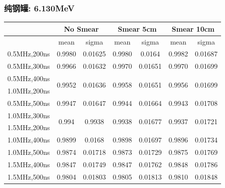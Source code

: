 \begin{frame}
    \frametitle{纯钢罐: 6.130MeV}

\begin{tabular}{|c|cc|cc|cc|}
\hline
 & \multicolumn{2}{|c|}{No Smear} 
 & \multicolumn{2}{|c|}{Smear 5cm}
 & \multicolumn{2}{|c|}{Smear 10cm}
\\
\hline
 & mean & sigma
 & mean & sigma
 & mean & sigma
\\
\hline
0.5MHz,200ns
 & 0.9980 &  0.01625
 & 0.9980 &  0.0164
 & 0.9982 &  0.01687
\\
\hline
0.5MHz,300ns
 & 0.9966 &  0.01632
 & 0.9970 &  0.01651
 & 0.9970 &  0.01699
\\
\hline
0.5MHz,400ns
& \multirow{2}{*}{0.9952} & \multirow{2}{*}{0.01636}
& \multirow{2}{*}{0.9958} & \multirow{2}{*}{0.01651}
& \multirow{2}{*}{0.9956} & \multirow{2}{*}{0.01699}
\\
\cline{1-1}
1.0MHz,200ns
 &  & 
 &  & 
 &  & 
\\
\hline
0.5MHz,500ns
 & 0.9947 &  0.01647
 & 0.9944 &  0.01664
 & 0.9943 &  0.01708
\\
\hline
1.0MHz,300ns
& \multirow{2}{*}{0.994} & \multirow{2}{*}{0.9938}
& \multirow{2}{*}{0.9938} & \multirow{2}{*}{0.01677}
& \multirow{2}{*}{0.9937} & \multirow{2}{*}{0.01721}
\\
\cline{1-1}
1.5MHz,200ns
 &  & 
 &  & 
 &  & 
\\
\hline
1.0MHz,400ns
 & 0.9899 &  0.0168
 & 0.9898 &  0.01697
 & 0.9896 &  0.01734
\\
\hline
1.0MHz,500ns
 & 0.9874 &  0.01718
 & 0.9873 &  0.01729
 & 0.9875 &  0.01769
\\
\hline
1.5MHz,400ns
 & 0.9847 &  0.01749
 & 0.9847 &  0.01762
 & 0.9848 &  0.01786
\\
\hline
1.5MHz,500ns
 & 0.9804 &  0.01803
 & 0.9805 &  0.01813
 & 0.9810 &  0.01848
\\
\hline
\end{tabular}

\end{frame}

